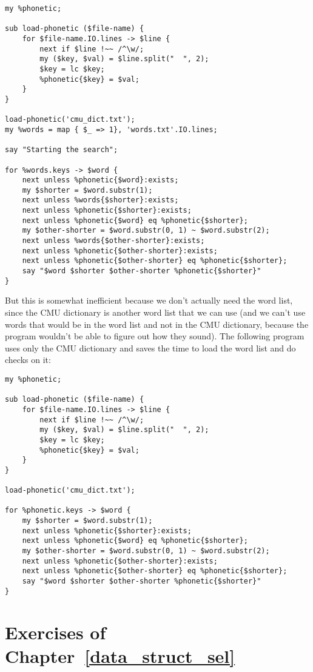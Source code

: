 \begin{verbatim}
my %phonetic;

sub load-phonetic ($file-name) {
    for $file-name.IO.lines -> $line {
        next if $line !~~ /^\w/; 
        my ($key, $val) = $line.split("  ", 2);
        $key = lc $key;
        %phonetic{$key} = $val;
    }
}

load-phonetic('cmu_dict.txt');
my %words = map { $_ => 1}, 'words.txt'.IO.lines;

say "Starting the search";

for %words.keys -> $word {
    next unless %phonetic{$word}:exists;
    my $shorter = $word.substr(1);
    next unless %words{$shorter}:exists;
    next unless %phonetic{$shorter}:exists;
    next unless %phonetic{$word} eq %phonetic{$shorter};
    my $other-shorter = $word.substr(0, 1) ~ $word.substr(2);
    next unless %words{$other-shorter}:exists;
    next unless %phonetic{$other-shorter}:exists;
    next unless %phonetic{$other-shorter} eq %phonetic{$shorter};
    say "$word $shorter $other-shorter %phonetic{$shorter}"
}
\end{verbatim}

But this is somewhat inefficient because we don't actually 
need the word list, since the CMU dictionary is another 
word list that we can use (and we can't use words 
that would be in the word list and not in the CMU dictionary, 
because the program wouldn't be able to figure out how 
they sound). The following program uses only the CMU 
dictionary and saves the time to load the word list and 
do checks on it:

\begin{verbatim}
my %phonetic;

sub load-phonetic ($file-name) {
    for $file-name.IO.lines -> $line {
        next if $line !~~ /^\w/; 
        my ($key, $val) = $line.split("  ", 2);
        $key = lc $key;
        %phonetic{$key} = $val;
    }
}

load-phonetic('cmu_dict.txt');

for %phonetic.keys -> $word {
    my $shorter = $word.substr(1);
    next unless %phonetic{$shorter}:exists;
    next unless %phonetic{$word} eq %phonetic{$shorter};
    my $other-shorter = $word.substr(0, 1) ~ $word.substr(2);
    next unless %phonetic{$other-shorter}:exists;
    next unless %phonetic{$other-shorter} eq %phonetic{$shorter};
    say "$word $shorter $other-shorter %phonetic{$shorter}"
}
\end{verbatim}

\section{Exercises of Chapter~\ref{data_struct_sel}}

